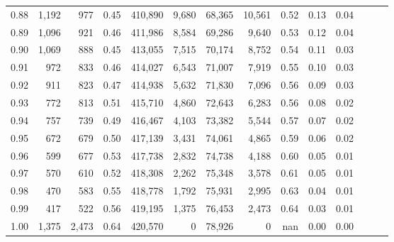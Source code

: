 \begin{tabular}{rrrrrrrrrrrrrr}
0.88 &   1,192 &    977 &  0.45 &  410,890 &    9,680 &  68,365 &  10,561 &  0.52 &  0.13 &      0.04 \\
0.89 &   1,096 &    921 &  0.46 &  411,986 &    8,584 &  69,286 &   9,640 &  0.53 &  0.12 &      0.04 \\
0.90 &   1,069 &    888 &  0.45 &  413,055 &    7,515 &  70,174 &   8,752 &  0.54 &  0.11 &      0.03 \\
0.91 &     972 &    833 &  0.46 &  414,027 &    6,543 &  71,007 &   7,919 &  0.55 &  0.10 &      0.03 \\
0.92 &     911 &    823 &  0.47 &  414,938 &    5,632 &  71,830 &   7,096 &  0.56 &  0.09 &      0.03 \\
0.93 &     772 &    813 &  0.51 &  415,710 &    4,860 &  72,643 &   6,283 &  0.56 &  0.08 &      0.02 \\
0.94 &     757 &    739 &  0.49 &  416,467 &    4,103 &  73,382 &   5,544 &  0.57 &  0.07 &      0.02 \\
0.95 &     672 &    679 &  0.50 &  417,139 &    3,431 &  74,061 &   4,865 &  0.59 &  0.06 &      0.02 \\
0.96 &     599 &    677 &  0.53 &  417,738 &    2,832 &  74,738 &   4,188 &  0.60 &  0.05 &      0.01 \\
0.97 &     570 &    610 &  0.52 &  418,308 &    2,262 &  75,348 &   3,578 &  0.61 &  0.05 &      0.01 \\
0.98 &     470 &    583 &  0.55 &  418,778 &    1,792 &  75,931 &   2,995 &  0.63 &  0.04 &      0.01 \\
0.99 &     417 &    522 &  0.56 &  419,195 &    1,375 &  76,453 &   2,473 &  0.64 &  0.03 &      0.01 \\
1.00 &   1,375 &  2,473 &  0.64 &  420,570 &        0 &  78,926 &       0 &   nan &  0.00 &      0.00 \\
\bottomrule
\end{tabular}
